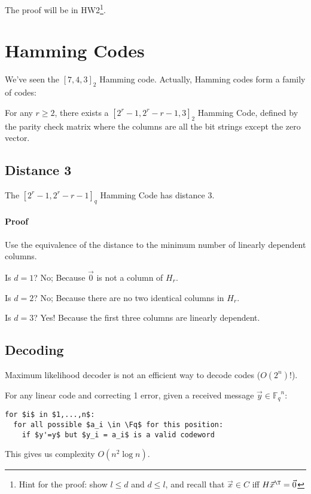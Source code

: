 \documentclass{idc_msc}
\newcommand{\Fq}{{\mathbb{F}_q}}
\begin{document}
The proof will be in HW2\footnote{Hint for the proof: show \(l \le d\) and \(d \le l\), and recall that \(\vec{x} \in C\) iff \(H \vec{x}^\T = \vec{0}\)}.

\section{Hamming Codes}

We've seen the \([7,4,3]_2\) Hamming code.
Actually, Hamming codes form a family of codes:

For any \(r \ge 2\), there exists a \([2^r-1,2^r-r-1,3]_2\) Hamming Code, defined by the parity check matrix where the columns are all the bit strings except the zero vector.

\subsection{Distance 3}

The \([2^r-1,2^r-r-1]_q\) Hamming Code has distance 3.

\paragraph{Proof}

Use the equivalence of the distance to the minimum number of linearly dependent columns.

Is \(d = 1\)? No; Because \(\vec{0}\) is not a column of \(H_r\).

Is \(d = 2\)? No; Because there are no two identical columns in \(H_r\).

Is \(d = 3\)? Yes! Because the first three columns are linearly dependent.

\subsection{Decoding}

Maximum likelihood decoder is not an efficient way to decode codes (\(O(2^n)\)!).

For any linear code and correcting 1 error, given a received message \(\vec{y} \in \Fq^n\):

\begin{lstlisting}[frame=L,mathescape=true,title={Some code}]
for $i$ in $1,...,n$:
  for all possible $a_i \in \Fq$ for this position:
    if $y'=y$ but $y_i = a_i$ is a valid codeword
\end{lstlisting}

This gives us complexity \(O(n^2 \log n)\).
\end{document}
